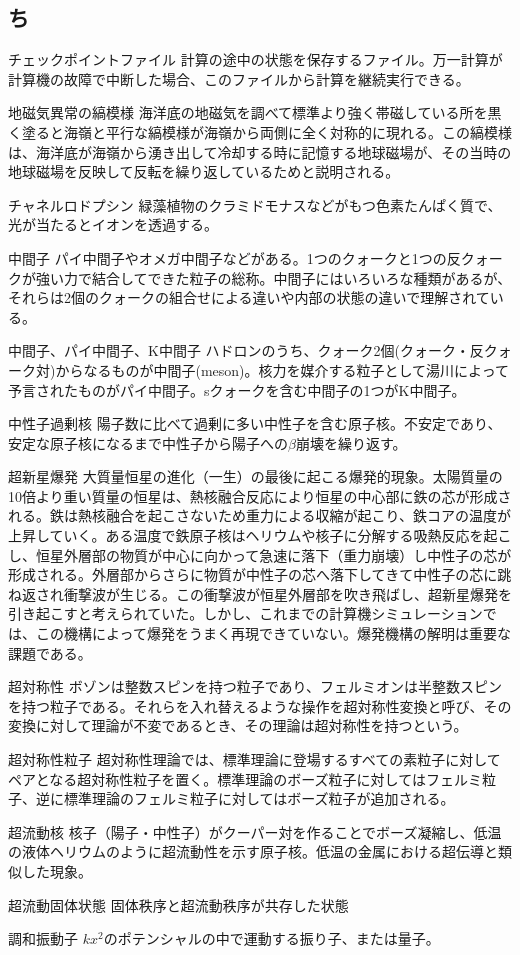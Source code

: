 \begin{用語集}
\section{ち}
\item{チェックポイントファイル}{}
{計算の途中の状態を保存するファイル。万一計算が計算機の故障で中断した場合、このファイルから計算を継続実行できる。}
\item{地磁気異常の縞模様}{}
{海洋底の地磁気を調べて標準より強く帯磁している所を黒く塗ると海嶺と平行な縞模様が海嶺から両側に全く対称的に現れる。この縞模様は、海洋底が海嶺から湧き出して冷却する時に記憶する地球磁場が、その当時の地球磁場を反映して反転を繰り返しているためと説明される。}
\item{チャネルロドプシン}{}
{緑藻植物のクラミドモナスなどがもつ色素たんぱく質で、光が当たるとイオンを透過する。}
\item{中間子}{}
{パイ中間子やオメガ中間子などがある。1つのクォークと1つの反クォークが強い力で結合してできた粒子の総称。中間子にはいろいろな種類があるが、それらは2個のクォークの組合せによる違いや内部の状態の違いで理解されている。}
\item{中間子、パイ中間子、K中間子}{}
{ハドロンのうち、クォーク2個(クォーク・反クォーク対)からなるものが中間子(meson)。核力を媒介する粒子として湯川によって予言されたものがパイ中間子。sクォークを含む中間子の1つがK中間子。}
\item{中性子過剰核}{}
{陽子数に比べて過剰に多い中性子を含む原子核。不安定であり、安定な原子核になるまで中性子から陽子への$\beta$崩壊を繰り返す。}
\item{超新星爆発}{}
{大質量恒星の進化（一生）の最後に起こる爆発的現象。太陽質量の10倍より重い質量の恒星は、熱核融合反応により恒星の中心部に鉄の芯が形成される。鉄は熱核融合を起こさないため重力による収縮が起こり、鉄コアの温度が上昇していく。ある温度で鉄原子核はヘリウムや核子に分解する吸熱反応を起こし、恒星外層部の物質が中心に向かって急速に落下（重力崩壊）し中性子の芯が形成される。外層部からさらに物質が中性子の芯へ落下してきて中性子の芯に跳ね返され衝撃波が生じる。この衝撃波が恒星外層部を吹き飛ばし、超新星爆発を引き起こすと考えられていた。しかし、これまでの計算機シミュレーションでは、この機構によって爆発をうまく再現できていない。爆発機構の解明は重要な課題である。}
\item{超対称性}{}
{ボゾンは整数スピンを持つ粒子であり、フェルミオンは半整数スピンを持つ粒子である。それらを入れ替えるような操作を超対称性変換と呼び、その変換に対して理論が不変であるとき、その理論は超対称性を持つという。}
\item{超対称性粒子}{}
{超対称性理論では、標準理論に登場するすべての素粒子に対してペアとなる超対称性粒子を置く。標準理論のボーズ粒子に対してはフェルミ粒子、逆に標準理論のフェルミ粒子に対してはボーズ粒子が追加される。}
\item{超流動核}{}
{核子（陽子・中性子）がクーパー対を作ることでボーズ凝縮し、低温の液体ヘリウムのように超流動性を示す原子核。低温の金属における超伝導と類似した現象。}
\item{超流動固体状態}{}
{固体秩序と超流動秩序が共存した状態}
\item{調和振動子}{}
{$k x^2$のポテンシャルの中で運動する振り子、または量子。}

\end{用語集}
